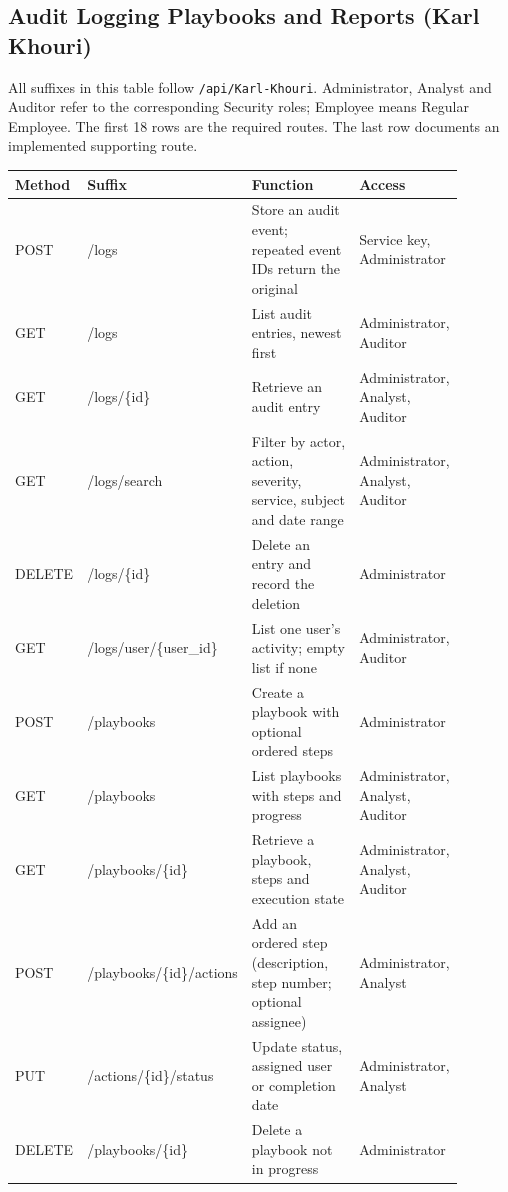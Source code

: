 \subsection{Audit Logging Playbooks and Reports (Karl Khouri)}
All suffixes in this table follow \texttt{/api/Karl-Khouri}. Administrator, Analyst and Auditor refer to the corresponding Security roles; Employee means Regular Employee. The first 18 rows are the required routes. The last row documents an implemented supporting route.

\begin{small}
\begin{longtable}{>{\raggedright\arraybackslash}p{0.10\linewidth}>{\raggedright\arraybackslash}p{0.28\linewidth}>{\raggedright\arraybackslash}p{0.32\linewidth}>{\raggedright\arraybackslash}p{0.19\linewidth}}
\toprule
\textbf{Method} & \textbf{Suffix} & \textbf{Function} & \textbf{Access} \\
\midrule
\endhead
POST & /logs & Store an audit event; repeated event IDs return the original & Service key, Administrator \\
GET & /logs & List audit entries, newest first & Administrator, Auditor \\
GET & /logs/\{id\} & Retrieve an audit entry & Administrator, Analyst, Auditor \\
GET & /logs/search & Filter by actor, action, severity, service, subject and date range & Administrator, Analyst, Auditor \\
DELETE & /logs/\{id\} & Delete an entry and record the deletion & Administrator \\
GET & /logs/user/\{user\_id\} & List one user's activity; empty list if none & Administrator, Auditor \\
POST & /playbooks & Create a playbook with optional ordered steps & Administrator \\
GET & /playbooks & List playbooks with steps and progress & Administrator, Analyst, Auditor \\
GET & /playbooks/\{id\} & Retrieve a playbook, steps and execution state & Administrator, Analyst, Auditor \\
POST & /playbooks/\{id\}/actions & Add an ordered step (description, step number; optional assignee) & Administrator, Analyst \\
PUT & /actions/\{id\}/status & Update status, assigned user or completion date & Administrator, Analyst \\
DELETE & /playbooks/\{id\} & Delete a playbook not in progress & Administrator \\

\end{longtable}
\end{small}
